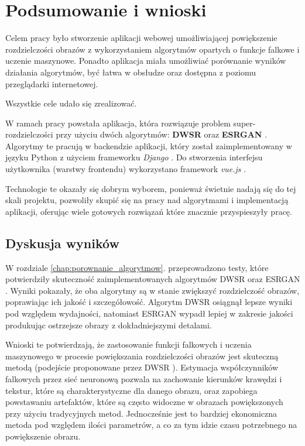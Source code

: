 \chapter{Podsumowanie i wnioski} \label{chap:podsumowanie}

Celem pracy było stworzenie aplikacji webowej umożliwiającej powiększenie rozdzielczości obrazów z wykorzystaniem algorytmów opartych o funkcje falkowe i uczenie maszynowe. Ponadto aplikacja miała umożliwiać porównanie wyników działania algorytmów, być łatwa w obsłudze oraz dostępna z poziomu przeglądarki internetowej.

Wszystkie cele udało się zrealizować. 

W ramach pracy powstała aplikacja, która rozwiązuje problem super-rozdzielczości przy użyciu dwóch algorytmów: \textbf{DWSR} \cite{guo2017deep} oraz \textbf{ESRGAN} \cite{wang2018esrgan}. Algorytmy te pracują w backendzie aplikacji, który został zaimplementowany w języku Python z użyciem frameworku \textit{Django} \cite{django}. Do stworzenia interfejsu użytkownika (warstwy frontendu) wykorzystano framework \textit{vue.js} \cite{vue}. 

Technologie te okazały się dobrym wyborem, ponieważ świetnie nadają się do tej skali projektu, pozwoliły skupić się na pracy nad algorytmami i implementacją aplikacji, oferując wiele gotowych rozwiązań które znacznie przyspieszyły pracę.


\section{Dyskusja wyników}

W rozdziale \ref{chap:porownanie_algorytmow}. przeprowadzono testy, które potwierdziły skuteczność zaimplementowanych algorytmów DWSR \cite{guo2017deep} oraz ESRGAN \cite{wang2018esrgan}. Wyniki pokazały, że oba algorytmy są w stanie zwiększyć rozdzielczość obrazów, poprawiając ich jakość i szczegółowość. Algorytm DWSR osiągnął lepsze wyniki pod względem wydajności, natomiast ESRGAN wypadł lepiej w zakresie jakości produkując ostrzejsze obrazy z dokładniejszymi detalami.

Wnioski te potwierdzają, że zastosowanie funkcji falkowych i uczenia maszynowego w procesie powiększania rozdzielczości obrazów jest skuteczną metodą (podejście proponowane przez DWSR \cite{guo2017deep}). Estymacja współczynników falkowych przez sieć neuronową pozwala na zachowanie kierunków krawędzi i tekstur, które są charakterystyczne dla danego obrazu, oraz zapobiega powstawaniu artefaktów, które są często widoczne w obrazach powiększonych przy użyciu tradycyjnych metod. Jednocześnie jest to bardziej ekonomiczna metoda pod względem ilości parametrów, a co za tym idzie czasu potrzebnego na powiększenie obrazu.

